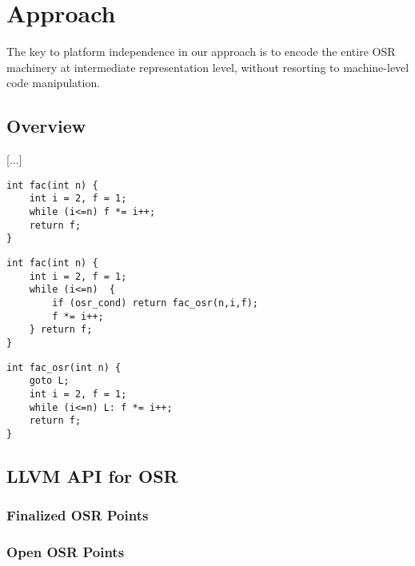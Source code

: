 \section{Approach}
\label{se:approach}

The key to platform independence in our approach is to encode the entire OSR machinery at intermediate representation level, without resorting to machine-level code manipulation.

\subsection{Overview}

[...]

\begin{verbatim}
int fac(int n) {
    int i = 2, f = 1;
    while (i<=n) f *= i++;
    return f;
}
\end{verbatim}

\begin{verbatim}
int fac(int n) {
    int i = 2, f = 1;
    while (i<=n)  {
        if (osr_cond) return fac_osr(n,i,f); 
        f *= i++; 
    } return f;
}
\end{verbatim}

\begin{verbatim}
int fac_osr(int n) {
    goto L;
    int i = 2, f = 1;
    while (i<=n) L: f *= i++;
    return f;
}
\end{verbatim}

\subsection{LLVM API for OSR}

\subsubsection{Finalized OSR Points}

\subsubsection{Open OSR Points}


  
  
  
  
  
  
  
  
  
  
  
  
  